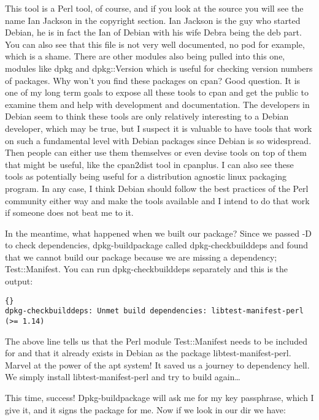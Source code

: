 This tool is a Perl tool, of course, and if you look at the source you will see
the name Ian Jackson in the copyright section. Ian Jackson is the guy who
started Debian, he is in fact the Ian of Debian with his wife Debra being the
deb part. You can also see that this f\hbox{}ile is not very well documented, no pod
for example, which is a shame. There are other modules also being pulled into
this one, modules like dpkg and dpkg::Version which is useful for checking
version numbers of packages. Why won't you f\hbox{}ind these packages on cpan? Good
question. It is one of my long term goals to expose all these tools to cpan and
get the public to examine them and help with development and documentation. The
developers in Debian seem to think these tools are only relatively interesting
to a Debian developer, which may be true, but I suspect it is valuable to have
tools that work on such a fundamental level with Debian packages since Debian is
so widespread. Then people can either use them themselves or even devise tools
on top of them that might be useful, like the cpan2dist tool in cpanplus. I can
also see these tools as potentially being useful for a distribution agnostic
linux packaging program. In any case, I think Debian should follow the best
practices of the Perl community either way and make the tools available and I
intend to do that work if someone does not beat me to it.

In the meantime, what happened when we built our package? Since we passed -D to
check dependencies, dpkg-buildpackage called dpkg-checkbuilddeps and found that
we cannot build our package because we are missing a dependency; Test::Manifest.
You can run dpkg-checkbuilddeps separately and this is the output:

\begin{lstlisting}[frame=trbl,label=cl:debs_cpan:dpkg-checkbuilddeps,caption=dpkg-checkbuilddeps output]{}
dpkg-checkbuilddeps: Unmet build dependencies: libtest-manifest-perl (>= 1.14)
\end{lstlisting}

The above line tells us that the Perl module Test::Manifest needs to be included
for and that it already exists in Debian as the package libtest-manifest-perl.
Marvel at the power of the apt system! It saved us a journey to dependency hell.
We simply install libtest-manifest-perl and try to build again\ldots

This time, success! Dpkg-buildpackage will ask me for my key passphrase, which I
give it, and it signs the package for me. Now if we look in our dir we have:


